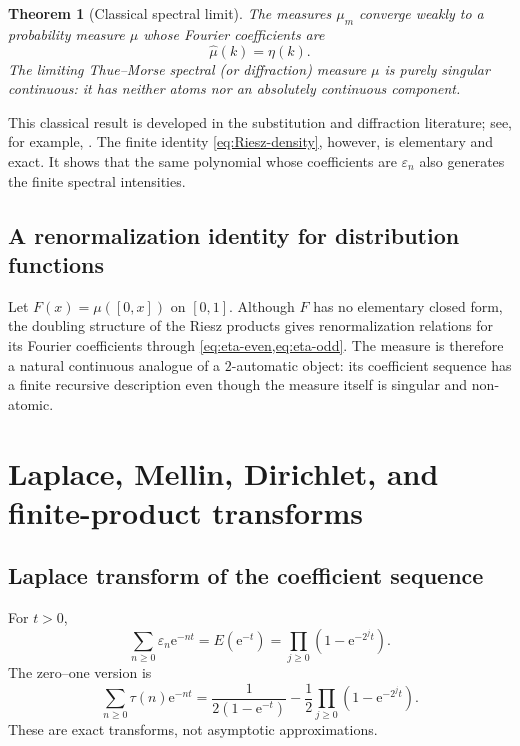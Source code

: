 \documentclass[11pt,oneside]{article}
\newtheorem{theorem}{Theorem}[section]
\theoremstyle{definition}
\theoremstyle{remark}
\newcommand{\e}{\mathrm e}
\newcommand{\eps}{\varepsilon}
\begin{document}
\begin{theorem}[Classical spectral limit]\label{thm:riesz-limit}
The measures $\mu_m$ converge weakly to a probability measure $\mu$ whose
Fourier coefficients are
\begin{equation}\label{eq:mu-fourier}
 \widehat\mu(k)=\eta(k).
\end{equation}
The limiting Thue--Morse spectral (or diffraction) measure $\mu$ is purely
singular continuous: it has neither atoms nor an absolutely continuous
component.
\end{theorem}

This classical result is developed in the substitution and diffraction
literature; see, for example,
\cite{queffelec2010,baakegrimm2008,alloucheshallit2003}.  The finite identity
\cref{eq:Riesz-density}, however, is elementary and exact.  It shows that the
same polynomial whose coefficients are $\eps_n$ also generates the finite
spectral intensities.

\subsection{A renormalization identity for distribution functions}

Let $F(x)=\mu([0,x])$ on $[0,1]$.  Although $F$ has no elementary closed form,
the doubling structure of the Riesz products gives renormalization relations
for its Fourier coefficients through \cref{eq:eta-even,eq:eta-odd}.  The
measure is therefore a natural continuous analogue of a $2$-automatic object:
its coefficient sequence has a finite recursive description even though the
measure itself is singular and non-atomic.

\section{Laplace, Mellin, Dirichlet, and finite-product transforms}

\subsection{Laplace transform of the coefficient sequence}

For $t>0$,
\begin{equation}\label{eq:laplace-discrete}
 \sum_{n\ge0}\eps_n\e^{-nt}
 =E(\e^{-t})
 =\prod_{j\ge0}\left(1-\e^{-2^jt}\right).
\end{equation}
The zero--one version is
\begin{equation}\label{eq:laplace-tau}
 \sum_{n\ge0}\tau(n)\e^{-nt}
 =\frac1{2(1-\e^{-t})}
  -\frac12\prod_{j\ge0}(1-\e^{-2^jt}).
\end{equation}
These are exact transforms, not asymptotic approximations.
\end{document}
